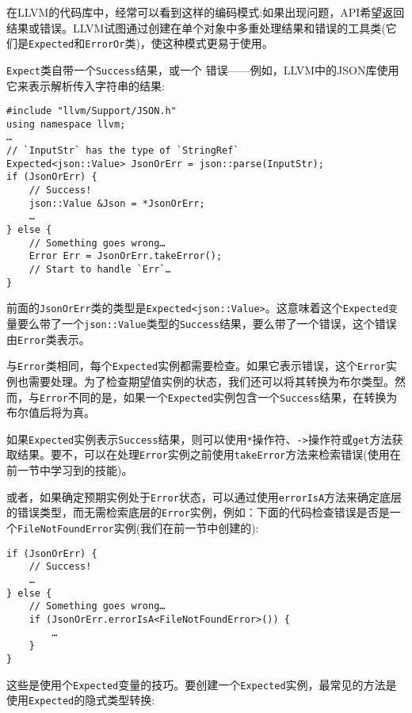 
在LLVM的代码库中，经常可以看到这样的编码模式:如果出现问题，API希望返回结果或错误。LLVM试图通过创建在单个对象中多重处理结果和错误的工具类(它们是\texttt{Expected}和\texttt{ErrorOr}类)，使这种模式更易于使用。


\texttt{Expect}类自带一个\texttt{Success}结果，或一个
错误——例如，LLVM中的JSON库使用它来表示解析传入字符串的结果:

\begin{lstlisting}[style=styleCXX]
#include "llvm/Support/JSON.h"
using namespace llvm;
…
// `InputStr` has the type of `StringRef`
Expected<json::Value> JsonOrErr = json::parse(InputStr);
if (JsonOrErr) {
	// Success!
	json::Value &Json = *JsonOrErr;
	…
} else {
	// Something goes wrong…
	Error Err = JsonOrErr.takeError();
	// Start to handle `Err`…
}
\end{lstlisting}

前面的\texttt{JsonOrErr}类的类型是\texttt{Expected<json::Value>}。这意味着这个\texttt{Expected变}量要么带了一个\texttt{json::Value}类型的\texttt{Success}结果，要么带了一个错误，这个错误由\texttt{Error}类表示。

与\texttt{Error}类相同，每个\texttt{Expected}实例都需要检查。如果它表示错误，这个\texttt{Error}实例也需要处理。为了检查期望值实例的状态，我们还可以将其转换为布尔类型。然而，与\texttt{Error}不同的是，如果一个\texttt{Expected}实例包含一个\texttt{Success}结果，在转换为布尔值后将为真。

如果\texttt{Expected}实例表示\texttt{Success}结果，则可以使用\texttt{*}操作符、\texttt{->}操作符或\texttt{get}方法获取结果。要不，可以在处理\texttt{Error}实例之前使用\texttt{takeError}方法来检索错误(使用在前一节中学习到的技能)。

或者，如果确定预期实例处于\texttt{Error}状态，可以通过使用\texttt{errorIsA}方法来确定底层的错误类型，而无需检索底层的\texttt{Error}实例，例如：下面的代码检查错误是否是一个\texttt{FileNotFoundError}实例(我们在前一节中创建的):

\begin{lstlisting}[style=styleCXX]
if (JsonOrErr) {
	// Success!
	…
} else {
	// Something goes wrong…
	if (JsonOrErr.errorIsA<FileNotFoundError>()) {
		…
	}
}
\end{lstlisting}

这些是使用个\texttt{Expected}变量的技巧。要创建一个\texttt{Expected}实例，最常见的方法是使用\texttt{Expected}的隐式类型转换:

